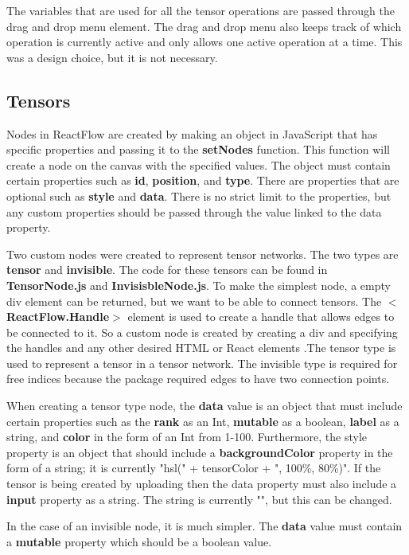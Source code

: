 \documentclass{juliacon}
\begin{document}
\begin{appendix}
The variables that are used for all the tensor operations are passed through the drag and drop menu element. The drag and drop menu also keeps track of which operation is currently active and only allows one active operation at a time. This was a design choice, but it is not necessary.

\subsection{Tensors}
Nodes in ReactFlow are created by making an object in JavaScript that has specific properties and passing it to the \textbf{setNodes} function. This function will create a node on the canvas with the specified values. The object must contain certain properties such as \textbf{id}, \textbf{position}, and \textbf{type}. There are properties that are optional such as \textbf{style} and \textbf{data}. There is no strict limit to the properties, but any custom properties should be passed through the value linked to the data property.

Two custom nodes were created to represent tensor networks. The two types are \textbf{tensor} and \textbf{invisible}. The code for these tensors can be found in \textbf{TensorNode.js} and \textbf{InvisisbleNode.js}. To make the simplest node, a empty div element can be returned, but we want to be able to connect tensors. The $<$\textbf{ReactFlow.Handle}$>$ element is used to create a handle that allows edges to be connected to it. So a custom node is created by creating a div and specifying the handles and any other desired HTML or React elements .The tensor type is used to represent a tensor in a tensor network. The invisible type is required for free indices because the package required edges to have two connection points.

When creating a tensor type node, the \textbf{data} value is an object that must include certain properties such as the \textbf{rank} as an Int, \textbf{mutable} as a boolean, \textbf{label} as a string, and \textbf{color} in the form of an Int from 1-100. Furthermore, the style property is an object that should include a \textbf{backgroundColor} property in the form of a string; it is currently "hsl(" + tensorColor + ", 100\%, 80\%)". If the tensor is being created by uploading then the data property must also include a \textbf{input} property as a string. The string is currently "", but this can be changed. 

In the case of an invisible node, it is much simpler. The \textbf{data} value must contain a \textbf{mutable} property which should be a boolean value. 


\end{appendix}
\end{document}
